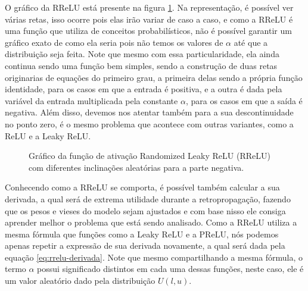 O gráfico da RReLU está presente na figura \ref{fig:rrelu}. Na representação, é possível ver várias retas, isso ocorre pois elas irão variar de caso a caso, e como a RReLU é uma função que utiliza de conceitos probabilísticos, não é possível garantir um gráfico exato de como ela seria pois não temos os valores de $\alpha$ até que a distribuição seja feita. Note que mesmo com essa particularidade, ela ainda continua sendo uma função bem simples, sendo a construção de duas retas originarias de equações do primeiro grau, a primeira delas sendo a própria função identidade, para os casos em que a entrada é positiva, e a outra é dada pela variável da entrada multiplicada pela constante $\alpha$, para os casos em que a saída é negativa. Além disso, devemos nos atentar também para a sua descontinuidade no ponto zero, é o mesmo problema que acontece com outras variantes, como a ReLU e a Leaky ReLU.

\begin{figure}[h!]
    \centering
    \caption{Gráfico da função de ativação Randomized Leaky ReLU (RReLU) com diferentes inclinações aleatórias para a parte negativa.}
    \label{fig:rrelu}
\end{figure}

Conhecendo como a RReLU se comporta, é possível também calcular a sua derivada, a qual será de extrema utilidade durante a retropropagação, fazendo que os pesos e vieses do modelo sejam ajustados e com base nisso ele consiga aprender melhor o problema que está sendo analisado. Como a RReLU utiliza a mesma fórmula que funções como a Leaky ReLU e a PReLU, nós podemos apenas repetir a expressão de sua derivada novamente, a qual será dada pela equação \ref{eq:rrelu-derivada}. Note que mesmo compartilhando a mesma fórmula, o termo $\alpha$ possui significado distintos em cada uma dessas funções, neste caso, ele é um valor aleatório dado pela distribuição $U(l, u)$.


